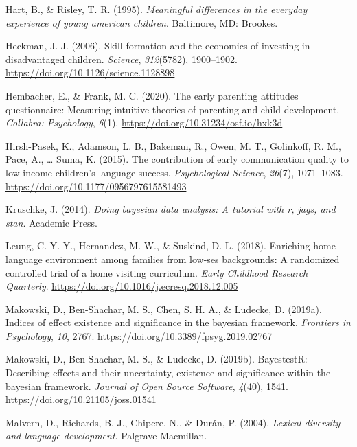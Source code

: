 \documentclass[
  english,
  man]{apa6}
\begin{document}
\leavevmode\hypertarget{ref-Hart1995}{}%
Hart, B., \& Risley, T. R. (1995). \emph{Meaningful differences in the everyday experience of young american children}. Baltimore, MD: Brookes.

\leavevmode\hypertarget{ref-Heckman2006}{}%
Heckman, J. J. (2006). Skill formation and the economics of investing in disadvantaged children. \emph{Science}, \emph{312}(5782), 1900--1902. \url{https://doi.org/10.1126/science.1128898}

\leavevmode\hypertarget{ref-Hembacher2020}{}%
Hembacher, E., \& Frank, M. C. (2020). The early parenting attitudes questionnaire: Measuring intuitive theories of parenting and child development. \emph{Collabra: Psychology}, \emph{6}(1). \url{https://doi.org/10.31234/osf.io/hxk3d}

\leavevmode\hypertarget{ref-HirshPasek2015}{}%
Hirsh-Pasek, K., Adamson, L. B., Bakeman, R., Owen, M. T., Golinkoff, R. M., Pace, A., \ldots{} Suma, K. (2015). The contribution of early communication quality to low-income children's language success. \emph{Psychological Science}, \emph{26}(7), 1071--1083. \url{https://doi.org/10.1177/0956797615581493}

\leavevmode\hypertarget{ref-Kruschke2014}{}%
Kruschke, J. (2014). \emph{Doing bayesian data analysis: A tutorial with r, jags, and stan}. Academic Press.

\leavevmode\hypertarget{ref-Leung2018}{}%
Leung, C. Y. Y., Hernandez, M. W., \& Suskind, D. L. (2018). Enriching home language environment among families from low-ses backgrounds: A randomized controlled trial of a home visiting curriculum. \emph{Early Childhood Research Quarterly}. \url{https://doi.org/10.1016/j.ecresq.2018.12.005}

\leavevmode\hypertarget{ref-Makowski2019}{}%
Makowski, D., Ben-Shachar, M. S., Chen, S. H. A., \& Ludecke, D. (2019a). Indices of effect existence and significance in the bayesian framework. \emph{Frontiers in Psychology}, \emph{10}, 2767. \url{https://doi.org/10.3389/fpsyg.2019.02767}

\leavevmode\hypertarget{ref-bayestestR}{}%
Makowski, D., Ben-Shachar, M. S., \& Ludecke, D. (2019b). BayestestR: Describing effects and their uncertainty, existence and significance within the bayesian framework. \emph{Journal of Open Source Software}, \emph{4}(40), 1541. \url{https://doi.org/10.21105/joss.01541}

\leavevmode\hypertarget{ref-Malvern2004}{}%
Malvern, D., Richards, B. J., Chipere, N., \& Durán, P. (2004). \emph{Lexical diversity and language development}. Palgrave Macmillan.
\end{document}
